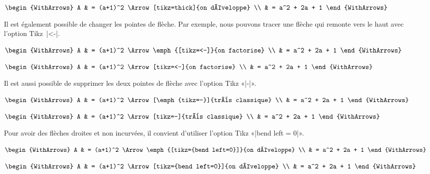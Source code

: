 \documentclass[dvipsnames]{article}%
\def\interitem{\vspace{7mm plus 2 mm minus 3mm}}
\begin{document}
$\begin{WithArrows}
A & = (a+1)^2 \Arrow[tikz=thick]{on développe} \\
  & = a^2 + 2a + 1 
\end{WithArrows}$

\interitem 
Il est également possible de changer les pointes de flèche. Par exemple, nous pouvons
tracer une flèche qui remonte vers le haut avec l'option Tikz~|<-|.\label{Backwards}

\begin{Code}
$\begin{WithArrows}
A & = (a+1)^2 \Arrow\emph{[tikz=<-]}{on factorise} \\
  & = a^2 + 2a + 1 
\end{WithArrows}$
\end{Code}

$\begin{WithArrows}
A & = (a+1)^2 \Arrow[tikz=<-]{on factorise} \\
  & = a^2 + 2a + 1 
\end{WithArrows}$

\interitem 
Il est aussi possible de supprimer les deux pointes de flèche avec l'option Tikz
«|-|».\par\nobreak
\begin{Code}
$\begin{WithArrows}
A & = (a+1)^2 \Arrow[\emph{tikz=-}]{très classique} \\
  & = a^2 + 2a + 1 
\end{WithArrows}$
\end{Code}

$\begin{WithArrows}
A & = (a+1)^2 \Arrow[tikz=-]{très classique} \\
  & = a^2 + 2a + 1 
\end{WithArrows}$

\interitem
Pour avoir des flèches droites et non incurvées, il convient d'utiliser l'option Tikz 
«|bend left = 0|».
\begin{Code}
$\begin{WithArrows}
A & = (a+1)^2 \Arrow\emph{[tikz={bend left=0}]}{on développe} \\
  & = a^2 + 2a + 1 
\end{WithArrows}$
\end{Code}

$\begin{WithArrows}
A & = (a+1)^2 \Arrow[tikz={bend left=0}]{on développe} \\
  & = a^2 + 2a + 1 
\end{WithArrows}$
\end{document}
